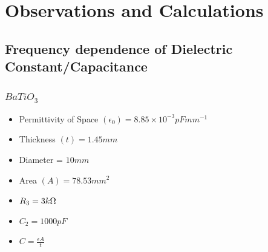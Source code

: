 \section{Observations and Calculations}
	\subsection{Frequency dependence of Dielectric Constant/Capacitance}
		\subsubsection{$BaTiO_3$}
			\begin{itemize}
				\item Permittivity of Space $(\epsilon_0) = 8.85\times10^{-3} pFmm^{-1}$
				\item Thickness $(t) = 1.45 mm$
				\item Diameter = $10 mm$
				\item Area $(A) = 78.53 mm^2$
				\item $R_3 = 3 k\ohm$
				\item $C_2 = 1000 pF$
				\item $C =\frac{\epsilon A}{t}$
			\end{itemize}

